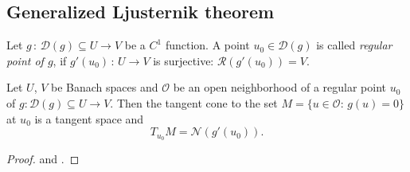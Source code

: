 \documentclass[../skript.tex]{subfiles}
\begin{document}
\subsection{Generalized Ljusternik theorem}

\begin{definition} %
\label{def:c1e30}
	Let $g\,:\,\mathcal{D}(g)\subseteq U\to V$ be a $C^1$ function. A point $u_0\in\mathcal{D}(g)$ is called \emph{regular point of $g$}, if $g'(u_0)\,:\,U\to V$ is surjective: $\mathcal{R}(g'(u_0)) = V$.
\end{definition}

\begin{theorem} %
\label{thm:c1e31}
	Let $U$, $V$ be Banach spaces and $\mathcal{O}$ be an open neighborhood of a regular point $u_0$ of $g:\mathcal{D}(g)\subseteq U\to V$. Then the tangent cone to the set $M = \{u\in\mathcal{O}:\,g(u) = 0\}$ at $u_0$ is a tangent space and
	\[
		T_{u_0}M = \mathcal{N}(g'(u_0)).
	\]
\end{theorem}
\begin{proof}
	\cite[Chapter 0.2.4]{Ioffe} and 
	\cite[Chapter 8, § 10]{Ljusternik}.
\end{proof}
\end{document}
